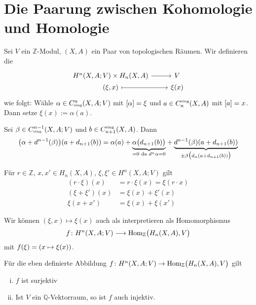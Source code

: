 \section{Die Paarung zwischen Kohomologie und Homologie} %
\label{sec:2}

\begin{definition}[{name=[Paarung]}]
	Sei $V$ ein $\mathbb{Z}$-Modul, $(X,A)$ ein Paar von topologischen Räumen. Wir definieren die 
	\[
		\begin{tikzcd}[row sep=0cm]
			H^n(X,A;V) \times H_n(X,A) \rar & V \\
			(\xi, x) \rar[mapsto] & \xi(x)
		\end{tikzcd}
	\]
	wie folgt: Wähle $\alpha \in C^n_\sing(X,A;V)$ mit $\benbrace*{\alpha}=\xi$ und $a \in C^\sing_n(X,A)$ mit $\benbrace*{a}=x$. Dann setze $\xi(x) := \alpha(a)$.
\end{definition}

\begin{bemerkung}
	Sei $\beta \in C^{n-1}_\sing(X,A;V)$ und $b \in C^\sing_{n+1}(X,A)$. Dann 
	\begin{align}
		\enbrace*{\alpha + d^{n-1}(\beta)}(a + d_{n+1}(b)) = \alpha(a) + \Underbrace{\alpha \enbrace[\big]{d_{n+1}(b)}}{=0 \text{ da } d^n \alpha=0 } + \Underbrace{d^{n-1}(\beta) \enbrace*{a + d_{n+1}(b)}}{\pm \beta \enbrace[\big]{d_n(a + d_{n+1}(b))}} 
	\end{align}
\end{bemerkung}

\begin{bemerkung}
	Für $r \in \mathbb{Z}$, $x,x' \in H_n(X,A)$, $\xi,\xi' \in H^n(X,A;V)$ gilt
	\begin{align}
		(r \cdot \xi)(x) &= r \cdot \xi(x) = \xi(r \cdot x) \\
		(\xi +\xi')(x) &= \xi(x) + \xi'(x) \\
		\xi(x+x')&= \xi(x) + \xi(x')
	\end{align}
\end{bemerkung}

\begin{bemerkung}
	Wir können $(\xi,x)\mapsto \xi(x)$ auch als interpretieren als Homomorphismus
	\[
		f \colon H^n(X,A;V) \longrightarrow \Hom_\mathbb{Z} \enbrace[\big]{H_n(X,A),V}
	\]
	mit $f(\xi)= \enbrace*{x \mapsto \xi(x)}$.
\end{bemerkung}

\begin{satz}[label=eig_kohomo_to_hom_homo]
	Für die eben definierte Abbildung $f \colon H^n(X,A;V) \to \Hom_\mathbb{Z} \enbrace[\big]{H_n(X,A),V}$ gilt
	\begin{enumerate}[(i)]
		\item $f$ ist surjektiv
		\item Ist $V$ ein $\mathbb{Q}$-Vektorraum, so ist $f$ auch injektiv.
	\end{enumerate}
\end{satz}

